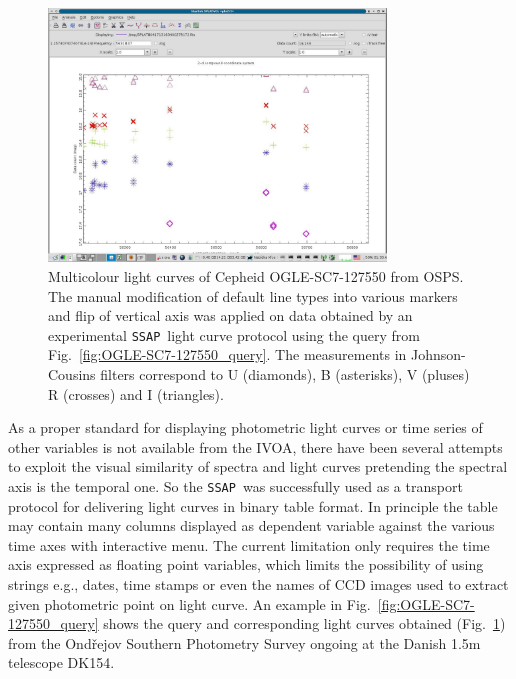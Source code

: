 \documentclass[final,authoryear,5p,times,twocolumn]{elsarticle}
\newcommand{\ssap}{\texttt{SSAP}}
\begin{document}
\begin{figure}[t]
\begin{center}
\includegraphics[width=0.8\textwidth]{OGLE-SC7-127550_plot.pdf}
\caption{Multicolour light curves of Cepheid OGLE-SC7-127550 from
  OSPS. The manual modification of default line types into various
  markers and flip of vertical axis was applied on data obtained by
  an experimental \ssap\ light curve protocol using the query from
  Fig.~\ref{fig:OGLE-SC7-127550_query}. The measurements in
  Johnson-Cousins filters correspond to U (diamonds), B (asterisks),
  V (pluses) R (crosses) and I (triangles).  }
\label{fig:OGLE-SC7-127550_plot}
\end{center}
\end{figure}

As a proper standard for displaying photometric light curves or time series
of other variables is not available from the IVOA, there have been several
attempts to exploit the visual similarity of spectra and light curves
pretending the spectral axis is the temporal one.  So the \ssap\ was
successfully used as a transport protocol for delivering light curves in
binary table format. In principle the table may contain many columns displayed
as dependent variable against the various time axes with interactive menu.
The current limitation only requires the time axis expressed as floating point
variables, which limits the possibility of using strings e.g., dates, time
stamps or even the names of CCD images used to extract given photometric point
on light curve.  An example in Fig.~\ref{fig:OGLE-SC7-127550_query} shows the
query and corresponding light curves obtained  (Fig.~\ref{fig:OGLE-SC7-127550_plot})  from
the Ond\v{r}ejov Southern Photometry Survey \citep{skoda_adassxxiii} ongoing
at the Danish 1.5m telescope DK154.
\end{document}
